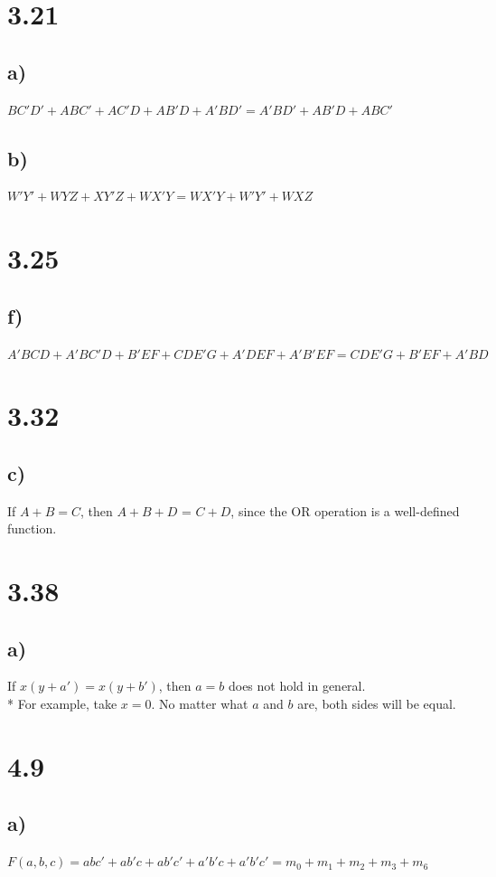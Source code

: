 \documentclass{article}
\begin{document}
\section{3.21}
\subsection{a)}
$BC'D' + ABC' + AC'D + AB'D + A'BD'
= A'BD' + AB'D + ABC'
$
\subsection{b)}
$W'Y' + WYZ + XY'Z + WX'Y
= WX'Y + W'Y' + WXZ
$

\section{3.25}
\subsection{f)}
$A'BCD + A'BC'D + B'EF + CDE'G + A'DEF + A'B'EF
= CDE'G + B'EF + A'BD
$

\section{3.32}
\subsection{c)}
If $A + B = C$, then $A + B + D$ = $C + D$, since the OR operation is a well-defined function.

\section{3.38}
\subsection{a)}
If $x(y + a') = x(y + b')$, then $a = b$ does not hold in general.
\\*
For example, take $x = 0$. No matter what $a$ and $b$ are, both sides will be equal.

\section{4.9}
\subsection{a)}
$F(a, b, c) = abc' + ab'c + ab'c' + a'b'c + a'b'c' = m_0 + m_1 + m_2 + m_3 + m_6$
\end{document}
